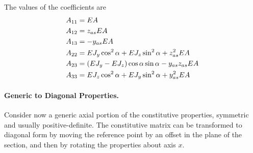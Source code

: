 The values of the coefficients are
\begin{subequations}
\begin{align}
	A_{11} &= EA \\
	A_{12} &= z_{as} EA \\
	A_{13} &= -y_{as} EA \\
	A_{22} &= EJ_y \cos^2\alpha + EJ_z \sin^2\alpha + z_{as}^2 EA \\
	A_{23} &= \left( EJ_y - EJ_z \right)\cos\alpha\sin\alpha - y_{as} z_{as} EA \\
	A_{33} &= EJ_z \cos^2\alpha + EJ_y \sin^2\alpha + y_{as}^2 EA
\end{align}
\end{subequations}



\paragraph{Generic to Diagonal Properties.}
Consider now a generic axial portion of the constitutive properties,
symmetric and usually positive-definite.
The constitutive matrix can be transformed to diagonal form
by moving the reference point by an offset in the plane of the section,
and then by rotating the properties about axis $x$.

